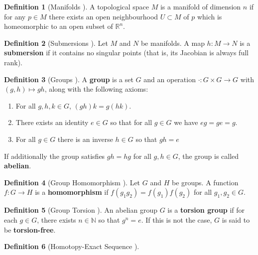 \documentclass[12pt]{article}
\theoremstyle{definition}
\newtheorem{defn}{Definition}
\begin{document}
\begin{defn}[Manifolds \cite{intro-top-manifolds}]
    A topological space \(M\) is a manifold of dimension \(n\) if for any
    \(p \in M\) there exists an open neighbourhood \(U \subset M\) of \(p\)
    which is homeomorphic to an open subset of \(\mathbb{R}^n\).
\end{defn}

\begin{defn}[Submersions \cite{robots-fiber-bundles}]
    Let \(M\) and \(N\) be manifolds. A map \(h : M \rightarrow N\) is a
    \textbf{submersion} if it contains no singular points (that is, its Jacobian
    is always full rank).
\end{defn}

\begin{defn}[Groups \cite{intro-top-manifolds}]
    A \textbf{group} is a set \(G\) and an operation 
    \(\cdot : G\times G \rightarrow G\) with \((g,h) \mapsto gh\), along with
    the following axioms:
    \begin{enumerate}
        \item For all \(g,h,k \in G\), \((gh)k = g(hk)\).
        \item There exists an identity \(e \in G\) so that for all \(g \in G\)
            we have \(eg = ge = g\).
        \item For all \(g \in G\) there is an inverse \(h \in G\) so that
        \(gh = e\)
    \end{enumerate}
    If additionally the group satisfies \(gh = hg\) for all \(g,h \in G\), the
    group is called \textbf{abelian}.
\end{defn}

\begin{defn}[Group Homomorphism \cite{intro-top-manifolds}]
    Let \(G\) and \(H\) be groups. A function \(f : G \rightarrow H\) is a
    \textbf{homomorphism} if \(f(g_1g_2) = f(g_1)f(g_2)\) for all 
    \(g_1,g_2 \in G\).
\end{defn}

\begin{defn}[Group Torsion \cite{intro-top-manifolds}]
    An abelian group \(G\) is a \textbf{torsion group} if for each \(g \in G\),
    there exists \(n \in \mathbb{N}\) so that \(g^n = e\). If this is not the
    case, \(G\) is said to be \textbf{torsion-free}.
\end{defn}

\begin{defn}[Homotopy-Exact Sequence \cite{}]

\end{defn}
\end{document}
